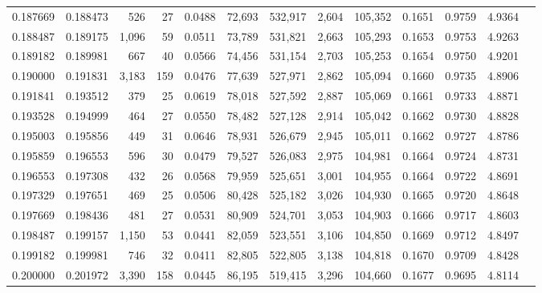 \begin{tabular}{rrrrrrrrrrrrr}
0.187669 & 0.188473 &   526 &  27 &                                     0.0488 &  72,693 & 532,917 &   2,604 & 105,352 & 0.1651 & 0.9759 & 4.9364 \\
0.188487 & 0.189175 & 1,096 &  59 &                                     0.0511 &  73,789 & 531,821 &   2,663 & 105,293 & 0.1653 & 0.9753 & 4.9263 \\
0.189182 & 0.189981 &   667 &  40 &                                     0.0566 &  74,456 & 531,154 &   2,703 & 105,253 & 0.1654 & 0.9750 & 4.9201 \\
0.190000 & 0.191831 & 3,183 & 159 &                                     0.0476 &  77,639 & 527,971 &   2,862 & 105,094 & 0.1660 & 0.9735 & 4.8906 \\
0.191841 & 0.193512 &   379 &  25 &                                     0.0619 &  78,018 & 527,592 &   2,887 & 105,069 & 0.1661 & 0.9733 & 4.8871 \\
0.193528 & 0.194999 &   464 &  27 &                                     0.0550 &  78,482 & 527,128 &   2,914 & 105,042 & 0.1662 & 0.9730 & 4.8828 \\
0.195003 & 0.195856 &   449 &  31 &                                     0.0646 &  78,931 & 526,679 &   2,945 & 105,011 & 0.1662 & 0.9727 & 4.8786 \\
0.195859 & 0.196553 &   596 &  30 &                                     0.0479 &  79,527 & 526,083 &   2,975 & 104,981 & 0.1664 & 0.9724 & 4.8731 \\
0.196553 & 0.197308 &   432 &  26 &                                     0.0568 &  79,959 & 525,651 &   3,001 & 104,955 & 0.1664 & 0.9722 & 4.8691 \\
0.197329 & 0.197651 &   469 &  25 &                                     0.0506 &  80,428 & 525,182 &   3,026 & 104,930 & 0.1665 & 0.9720 & 4.8648 \\
0.197669 & 0.198436 &   481 &  27 &                                     0.0531 &  80,909 & 524,701 &   3,053 & 104,903 & 0.1666 & 0.9717 & 4.8603 \\
0.198487 & 0.199157 & 1,150 &  53 &                                     0.0441 &  82,059 & 523,551 &   3,106 & 104,850 & 0.1669 & 0.9712 & 4.8497 \\
0.199182 & 0.199981 &   746 &  32 &                                     0.0411 &  82,805 & 522,805 &   3,138 & 104,818 & 0.1670 & 0.9709 & 4.8428 \\
0.200000 & 0.201972 & 3,390 & 158 &                                     0.0445 &  86,195 & 519,415 &   3,296 & 104,660 & 0.1677 & 0.9695 & 4.8114 \\

\end{tabular}

